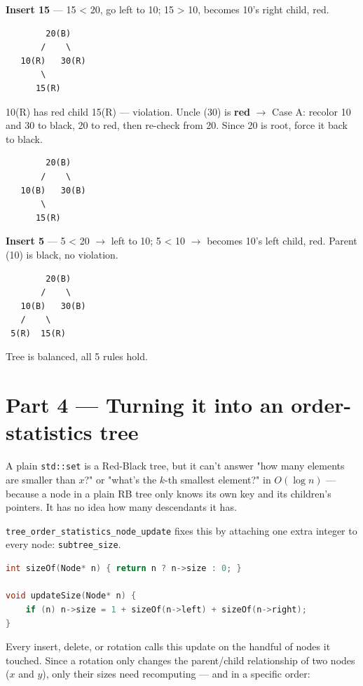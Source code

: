 \documentclass[11pt,a4paper]{article}
\begin{document}
\textbf{Insert 15} --- 15 \textless{} 20, go left to 10; 15 \textgreater{} 10, becomes 10's right child, red.

\begin{lstlisting}
        20(B)
       /    \
   10(R)   30(R)
       \
      15(R)
\end{lstlisting}

10(R) has red child 15(R) --- violation. Uncle (30) is \textbf{red} $\rightarrow$ Case A: recolor 10 and 30 to black, 20 to red, then re-check from 20. Since 20 is root, force it back to black.

\begin{lstlisting}
        20(B)
       /    \
   10(B)   30(B)
       \
      15(R)
\end{lstlisting}

\textbf{Insert 5} --- 5 \textless{} 20 $\rightarrow$ left to 10; 5 \textless{} 10 $\rightarrow$ becomes 10's left child, red. Parent (10) is black, no violation.

\begin{lstlisting}
        20(B)
       /    \
   10(B)   30(B)
   /    \
 5(R)  15(R)
\end{lstlisting}

Tree is balanced, all 5 rules hold.

\section{Part 4 --- Turning it into an order-statistics tree}

A plain \texttt{std::set} is a Red-Black tree, but it can't answer "how many elements are smaller than $x$?" or "what's the $k$-th smallest element?" in $O(\log n)$ --- because a node in a plain RB tree only knows its own key and its children's pointers. It has no idea how many descendants it has.

\texttt{tree\_order\_statistics\_node\_update} fixes this by attaching one extra integer to every node: \texttt{subtree\_size}.

\begin{lstlisting}[language=C++]
int sizeOf(Node* n) { return n ? n->size : 0; }

void updateSize(Node* n) {
    if (n) n->size = 1 + sizeOf(n->left) + sizeOf(n->right);
}
\end{lstlisting}

Every insert, delete, or rotation calls this update on the handful of nodes it touched. Since a rotation only changes the parent/child relationship of two nodes ($x$ and $y$), only their sizes need recomputing --- and in a specific order:
\end{document}
